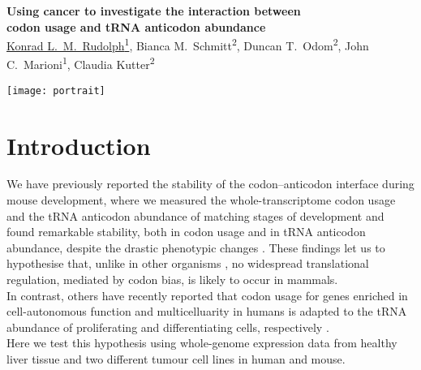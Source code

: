 \documentclass[a0,portrait]{a0poster}
\begin{document}
\sffamily
\Large

\noindent
\begin{minipage}[][10cm][t]{0.88\textwidth}
    {
        \VeryHuge\color{accent}\bfseries\sffamily%
        Using cancer to investigate the interaction between\\[0.1cm]
        codon usage and tRNA anticodon abundance
    }
    {
        \\[\baselineskip]
        \noindent
        \Large\color{Black}%
        \underline{Konrad L.\ M.\ Rudolph\textsuperscript{1}},
        Bianca M.\ Schmitt\textsuperscript{2},
        Duncan T.\ Odom\textsuperscript{2},
        John C.\ Marioni\textsuperscript{1},
        Claudia Kutter\textsuperscript{2}
    }
\end{minipage}%
\hfill%
\begin{minipage}[][10cm][t]{0.1\textwidth}
    \raggedleft
    \texttt{[image: portrait]}
\end{minipage}

\vspace{-1cm}
\section*{Introduction}
{
\LARGE
We have previously reported the stability of the codon--anticodon interface
during mouse development, where we measured the whole-transcriptome codon
usage and the tRNA anticodon abundance of matching stages of development and
found remarkable stability, both in codon usage and in tRNA anticodon
abundance, despite the drastic phenotypic changes \citep{Schmitt:2014}.
These findings let us to hypothesise that, unlike in other organisms
\citep{Carlini:2003}, no widespread translational regulation, mediated by codon
bias, is likely to occur in mammals.\\
In contrast, others have recently reported that codon usage for genes
enriched in cell-autonomous function and multicelluarity in humans is
adapted to the tRNA abundance of proliferating and differentiating cells,
respectively \citep{Gingold:2014}.\\
Here we test this hypothesis using whole-genome expression data from healthy
liver tissue and two different tumour cell lines in human and mouse.
}

\vspace{-0.5cm}
\end{document}
